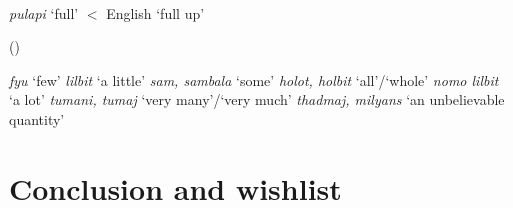 \documentclass{article}
\begin{document}
\begin{exe} 
 \\
{\it pulapi} `full' $<$ English `full up'

 (\citealt[100]{sandefur79})
\begin{xlist}
\ex \textit{fyu} `few'
\ex \textit{lilbit} `a little'
\ex \textit{sam, sambala} `some'
\ex \textit{holot, holbit} `all'/`whole'
\ex \textit{nomo lilbit} `a lot'
\ex \textit{tumani, tumaj} `very many'/`very much'
\ex \textit{thadmaj, milyans} `an unbelievable quantity'
\end{xlist}
\end{exe}

\section{Conclusion and wishlist}
\end{document}

